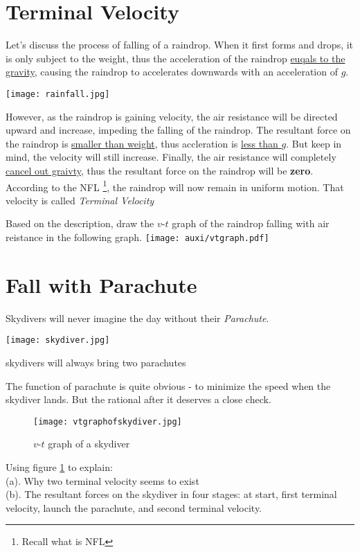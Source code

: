 \documentclass[a4paper]{tufte-handout}
\newenvironment{TaskBox} %
{\begin{tcolorbox}[breakable,colback=b1!30,colframe=b1,title=Task]} {\end{tcolorbox}}
\begin{document}
\section{Terminal Velocity}
Let's discuss the process of falling of a raindrop. When it first forms and drops, it is only subject to the weight, thus the acceleration of the raindrop \uline{euqals to the gravity}, causing the raindrop to accelerates downwards with an acceleration of $g$. 
\begin{marginfigure}
\centering
\texttt{[image: rainfall.jpg]}
\end{marginfigure}
However, as the raindrop is gaining velocity, the air resistance will be directed upward and increase, impeding the falling of the raindrop. The resultant force on the raindrop is \uline{smaller than weight}, thus accleration is \uline{less than $g$}. But keep in mind, the velocity will still increase. Finally, the air resistance will completely \uline{cancel out graivty}, thus the resultant force on the raindrop will be \textbf{zero}. According to the NFL \footnote{Recall what is NFL}, the raindrop will now remain in uniform motion. That velocity is called \emph{Terminal Velocity}

\begin{TaskBox}
Based on the description, draw the $v$-$t$ graph of the raindrop falling with air reistance in the following graph.
\texttt{[image: auxi/vtgraph.pdf]}
\end{TaskBox}

\section{Fall with Parachute}
Skydivers will never imagine the day without their \emph{Parachute}.
\begin{marginfigure}
\texttt{[image: skydiver.jpg]}
\caption{skydivers will always bring two parachutes}
\end{marginfigure}
The function of parachute is quite obvious - to minimize the speed when the skydiver lands. But the rational after it deserves a close check. 
\begin{figure}
\texttt{[image: vtgraphofskydiver.jpg]}
\caption{$v$-$t$ graph of a skydiver}
\label{fig:vtgraph of skydiver}
\end{figure}

\begin{TaskBox}
Using figure \ref{fig:vtgraph of skydiver} to explain:\\
(a). Why two terminal velocity seems to exist\\
(b). The resultant forces on the skydiver in four stages: at start, first terminal velocity, launch the parachute, and second terminal velocity.\\
\vspace{0.5 in}
\end{TaskBox}
\end{document}
